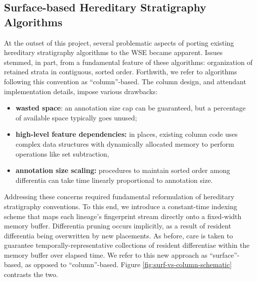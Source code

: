 \subsection{Surface-based Hereditary Stratigraphy Algorithms}

At the outset of this project, several problematic aspects of porting existing hereditary stratigraphy algorithms to the WSE became apparent.
Issues stemmed, in part, from a fundamental feature of these algorithms: organization of retained strata in contiguous, sorted order.
Forthwith, we refer to algorithms following this convention as ``column''-based.
The column design, and attendant implementation details, impose various drawbacks:
\begin{itemize}
\item \textbf{wasted space}: an annotation size cap can be guaranteed, but a percentage of available space typically goes unused;
\item \textbf{high-level feature dependencies:} in places, existing column code uses complex data structures with dynamically allocated memory to perform operations like set subtraction,
\item \textbf{annotation size scaling:} procedures to maintain sorted order among differentia can take time linearly proportional to annotation size.
\end{itemize}



Addressing these concerns required fundamental reformulation of hereditary stratigraphy conventions.
To this end, we introduce a constant-time indexing scheme that maps each lineage's fingerprint stream directly onto a fixed-width memory buffer.
Differentia pruning occurs implicitly, as a result of resident differentia being overwritten by new placements.
As before, care is taken to guarantee temporally-representative collections of resident differentiae within the memory buffer over elapsed time.
We refer to this new approach as ``surface''-based, as opposed to ``column''-based.
Figure \ref{fig:surf-vs-column-schematic} contrasts the two.




